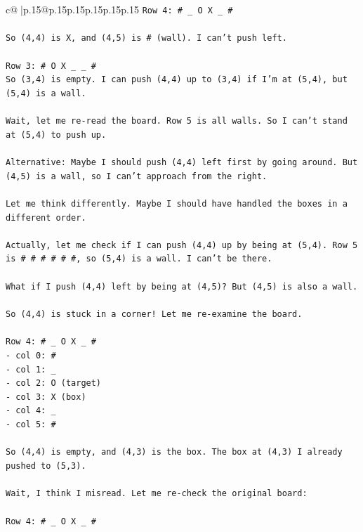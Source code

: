 \documentclass{article}
\begin{document}
{\begin{supertabular}{c@{$\;$}|p{.15\linewidth}@{}p{.15\linewidth}p{.15\linewidth}p{.15\linewidth}p{.15\linewidth}p{.15\linewidth}}
{{{\texttt{Row 4: \# \_ O X \_ \#} \\
\\ 
\texttt{So (4,4) is X, and (4,5) is \# (wall). I can't push left.} \\
\\ 
\texttt{Row 3: \# O X \_ \_ \#} \\
\texttt{So (3,4) is empty. I can push (4,4) up to (3,4) if I'm at (5,4), but (5,4) is a wall.} \\
\\ 
\texttt{Wait, let me re{-}read the board. Row 5 is all walls. So I can't stand at (5,4) to push up.} \\
\\ 
\texttt{Alternative: Maybe I should push (4,4) left first by going around. But (4,5) is a wall, so I can't approach from the right.} \\
\\ 
\texttt{Let me think differently. Maybe I should have handled the boxes in a different order.} \\
\\ 
\texttt{Actually, let me check if I can push (4,4) up by being at (5,4). Row 5 is \# \# \# \# \# \#, so (5,4) is a wall. I can't be there.} \\
\\ 
\texttt{What if I push (4,4) left by being at (4,5)? But (4,5) is also a wall.} \\
\\ 
\texttt{So (4,4) is stuck in a corner! Let me re{-}examine the board.} \\
\\ 
\texttt{Row 4: \# \_ O X \_ \#} \\
\texttt{{-} col 0: \#} \\
\texttt{{-} col 1: \_} \\
\texttt{{-} col 2: O (target)} \\
\texttt{{-} col 3: X (box)} \\
\texttt{{-} col 4: \_} \\
\texttt{{-} col 5: \#} \\
\\ 
\texttt{So (4,4) is empty, and (4,3) is the box. The box at (4,3) I already pushed to (5,3).} \\
\\ 
\texttt{Wait, I think I misread. Let me re{-}check the original board:} \\
\\ 
\texttt{Row 4: \# \_ O X \_ \#} \\
}}}
\end{supertabular}}
\end{document}
